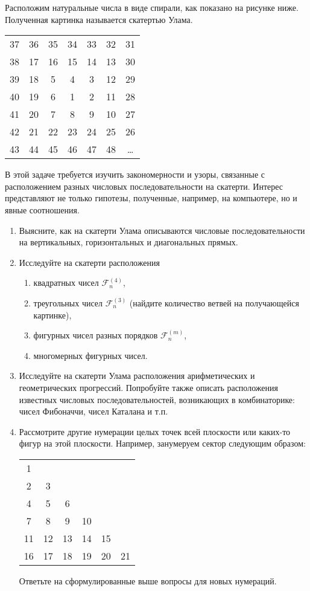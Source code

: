 
Расположим натуральные числа в виде спирали, как показано на рисунке ниже. Полученная картинка называется скатертью Улама.

\begin{center}
\begin{tabular}{ c c c c c c c }
37 & 36 & 35 & 34 & 33 & 32 & 31 \\
38 & 17 & 16 & 15 & 14 & 13 & 30 \\
39 & 18 & 5  & 4  & 3  & 12 & 29 \\
40 & 19 & 6  & 1  & 2  & 11 & 28 \\
41 & 20 & 7  & 8  & 9  & 10 & 27 \\
42 & 21 & 22 & 23 & 24 & 25 & 26 \\
43 & 44 & 45 & 46 & 47 & 48 & \ldots
\end{tabular}
\end{center}

В этой задаче требуется изучить закономерности и узоры, связанные с расположением разных числовых последовательности на скатерти. Интерес представляют не только гипотезы, полученные, например, на компьютере, но и явные соотношения.

\begin{enumerate}
\item Выясните, как на скатерти Улама описываются числовые последовательности на вертикальных, горизонтальных и диагональных прямых.
\item Исследуйте на скатерти расположения
\begin{enumerate}
\item квадратных чисел $\mathcal{F}_n^{(4)}$,
\item треугольных чисел $\mathcal{F}_n^{(3)}$ (найдите количество ветвей на получающейся картинке),
\item фигурных чисел разных порядков $\mathcal{F}_n^{(m)}$,
\item многомерных фигурных чисел.
\end{enumerate}
\item Исследуйте на скатерти Улама расположения арифметических и геометрических прогрессий. Попробуйте также описать расположения известных числовых последовательностей, возникающих в комбинаторике: чисел Фибоначчи, чисел Каталана и т.п.
\item Рассмотрите другие нумерации целых точек всей плоскости или каких-то фигур на этой плоскости. Например, занумеруем сектор следующим образом:

\begin{center}
\begin{tabular}{ c c c c c c }
1 &  &  &  &   & \\
2 & 3 &  &  &  &  \\
4 & 5 & 6 &  & & \\
7 & 8  & 9 & 10& &  \\
11& 12 & 13& 14& 15 & \\
16& 17 & 18& 19& 20 & 21  
\end{tabular}
\end{center}
Ответьте на сформулированные выше вопросы для новых нумераций.
\end{enumerate}